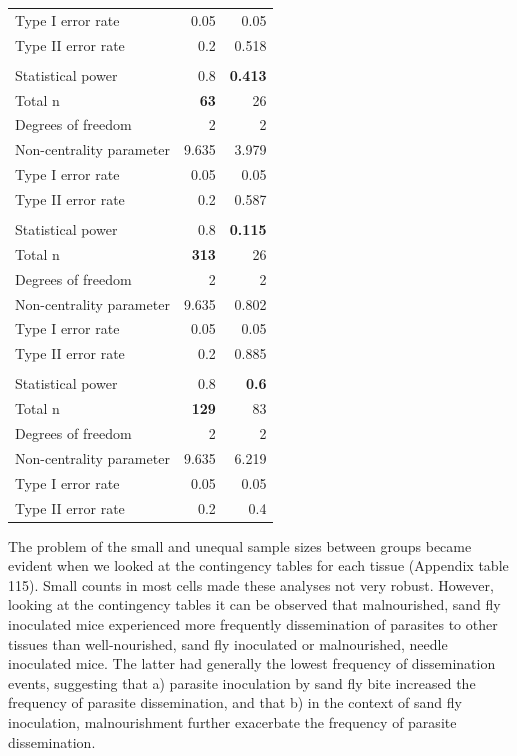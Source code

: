 \documentclass[
  12pt,
  letterpaper,
]{article}
\begin{document}
\begin{longtable}{l|rr}
Type I error rate & 0.05 & 0.05 \\ 
Type II error rate & 0.2 & 0.518 \\ 
\midrule\addlinespace[2.5pt]
\multicolumn{3}{l}{Liver} \\[2.5pt] 
\midrule\addlinespace[2.5pt]
Statistical power & 0.8 & {\bfseries 0.413} \\ 
Total n & {\bfseries 63} & 26 \\ 
Degrees of freedom & 2 & 2 \\ 
Non-centrality parameter & 9.635 & 3.979 \\ 
Type I error rate & 0.05 & 0.05 \\ 
Type II error rate & 0.2 & 0.587 \\ 
\midrule\addlinespace[2.5pt]
\multicolumn{3}{l}{Paw} \\[2.5pt] 
\midrule\addlinespace[2.5pt]
Statistical power & 0.8 & {\bfseries 0.115} \\ 
Total n & {\bfseries 313} & 26 \\ 
Degrees of freedom & 2 & 2 \\ 
Non-centrality parameter & 9.635 & 0.802 \\ 
Type I error rate & 0.05 & 0.05 \\ 
Type II error rate & 0.2 & 0.885 \\ 
\midrule\addlinespace[2.5pt]
\multicolumn{3}{l}{Spleen} \\[2.5pt] 
\midrule\addlinespace[2.5pt]
Statistical power & 0.8 & {\bfseries 0.6} \\ 
Total n & {\bfseries 129} & 83 \\ 
Degrees of freedom & 2 & 2 \\ 
Non-centrality parameter & 9.635 & 6.219 \\ 
Type I error rate & 0.05 & 0.05 \\ 
Type II error rate & 0.2 & 0.4 \\ 
\bottomrule
\end{longtable}
\endgroup

The problem of the small and unequal sample sizes between groups became evident when we looked at the contingency tables for each tissue (Appendix table 115). Small counts in most cells made these analyses not very robust. However, looking at the contingency tables it can be observed that malnourished, sand fly inoculated mice experienced more frequently dissemination of parasites to other tissues than well-nourished, sand fly inoculated or malnourished, needle inoculated mice. The latter had generally the lowest frequency of dissemination events, suggesting that a) parasite inoculation by sand fly bite increased the frequency of parasite dissemination, and that b) in the context of sand fly inoculation, malnourishment further exacerbate the frequency of parasite dissemination.
\end{document}

